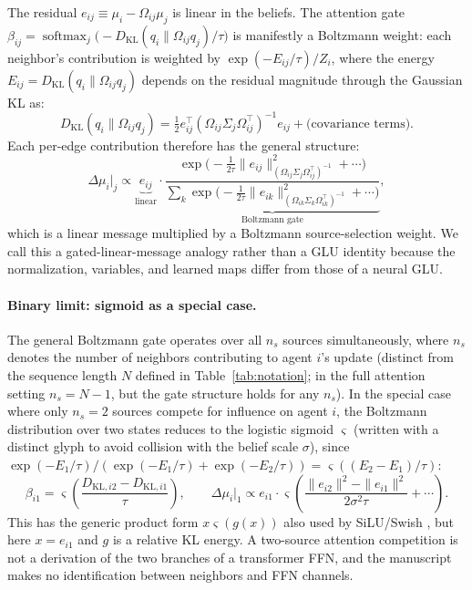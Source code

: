 \documentclass[twoside,11pt]{article}
\begin{document}
The residual $e_{ij} \equiv \mu_i - \Omega_{ij}\mu_j$ is linear in the beliefs. The attention gate $\beta_{ij} = \operatorname{softmax}_j \bigl(-D_{\mathrm{KL}}(q_i \| \Omega_{ij}q_j)/\tau\bigr)$ is manifestly a Boltzmann weight: each neighbor's contribution is weighted by $\exp(-E_{ij}/\tau)/Z_i$, where the energy $E_{ij} = D_{\mathrm{KL}}(q_i \| \Omega_{ij}q_j)$ depends on the residual magnitude through the Gaussian KL as:
%
\begin{equation}
D_{\mathrm{KL}}(q_i \| \Omega_{ij}q_j) = \tfrac{1}{2} e_{ij}^\top (\Omega_{ij}\Sigma_j\Omega_{ij}^\top)^{-1} e_{ij} + \text{(covariance terms)}.
\label{eq:dkl_quadratic}
\end{equation}
%
Each per-edge contribution therefore has the general structure:
%
\begin{equation}
\boxed{\Delta\mu_i\big|_j \propto \underbrace{e_{ij}}_{\text{linear}} \cdot \underbrace{\frac{\exp \bigl(-\tfrac{1}{2\tau}\|e_{ij}\|^2_{(\Omega_{ij}\Sigma_j\Omega_{ij}^\top)^{-1}} + \cdots\bigr)}{\sum_k \exp \bigl(-\tfrac{1}{2\tau}\|e_{ik}\|^2_{(\Omega_{ik}\Sigma_k\Omega_{ik}^\top)^{-1}} + \cdots\bigr)}}_{\text{Boltzmann gate}},}
\label{eq:vfe_glu}
\end{equation}
%
which is a linear message multiplied by a Boltzmann source-selection weight. We call this a gated-linear-message analogy rather than a GLU identity because the normalization, variables, and learned maps differ from those of a neural GLU.

\paragraph{Binary limit: sigmoid as a special case.}

The general Boltzmann gate operates over all $n_s$ sources simultaneously, where $n_s$ denotes the number of neighbors contributing to agent $i$'s update (distinct from the sequence length $N$ defined in Table~\ref{tab:notation}; in the full attention setting $n_s = N-1$, but the gate structure holds for any $n_s$). In the special case where only $n_s = 2$ sources compete for influence on agent $i$, the Boltzmann distribution over two states reduces to the logistic sigmoid $\varsigma$ (written with a distinct glyph to avoid collision with the belief scale $\sigma$), since $\exp(-E_1/\tau)/(\exp(-E_1/\tau) + \exp(-E_2/\tau)) = \varsigma((E_2 - E_1)/\tau)$:
%
\begin{equation}
\beta_{i1} = \varsigma \left(\frac{D_{\mathrm{KL},i2} - D_{\mathrm{KL},i1}}{\tau}\right),
\qquad
\Delta\mu_i\big|_1 \propto e_{i1} \cdot \varsigma \left(\frac{\|e_{i2}\|^2 - \|e_{i1}\|^2}{2\sigma^2\tau} + \cdots\right).
\label{eq:binary_silu}
\end{equation}
%
This has the generic product form $x\varsigma(g(x))$ also used by SiLU/Swish \citep{ramachandran2018searching}, but here $x=e_{i1}$ and $g$ is a relative KL energy. A two-source attention competition is not a derivation of the two branches of a transformer FFN, and the manuscript makes no identification between neighbors and FFN channels.
\end{document}
